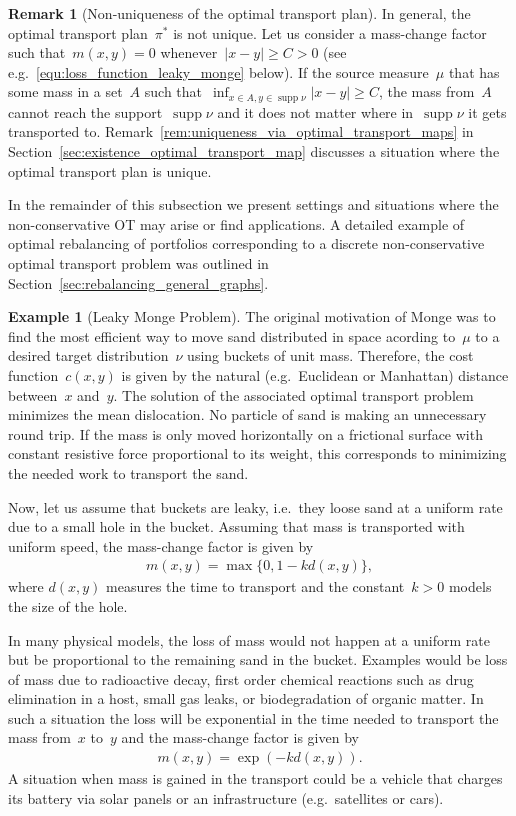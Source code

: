 \documentclass{article}
\theoremstyle{definition}
\newtheorem{example}[theorem]{Example}
\newtheorem{remark}[theorem]{Remark}
\DeclareMathOperator{\supp}{supp}
\begin{document}
\begin{remark}[Non-uniqueness of the optimal transport plan]
    In general, the optimal transport plan~$\pi^*$ is not unique. Let us consider a mass-change factor such that~$m(x,y)=0$ whenever~$|x-y| \geq C >0$ (see e.g.~\eqref{equ:loss_function_leaky_monge} below).  If the source measure~$\mu$ that has some mass in a set~$A$ such that~$\inf_{x \in A, y \in \supp \nu} |x-y| \geq C$, the mass from~$A$ cannot reach the support~$\supp \nu$ and it does not matter where in~$\supp \nu$ it gets transported to. Remark~\ref{rem:uniqueness_via_optimal_transport_maps} in Section~\ref{sec:existence_optimal_transport_map} discusses a situation where the optimal transport plan is unique. 
\end{remark}

In the remainder of this subsection we present settings and situations where the non-conservative OT may arise or find applications. A detailed example of optimal rebalancing of portfolios corresponding to a discrete non-conservative optimal transport problem was outlined in Section~\ref{sec:rebalancing_general_graphs}.
\begin{example}[Leaky Monge Problem]
    The original motivation of Monge was to find the most efficient way to move sand distributed in space acording to~$\mu$ to a desired target distribution~$\nu$ using buckets of unit mass. Therefore, the cost function~$c(x,y)$ is given by the natural (e.g.~Euclidean or Manhattan) distance between~$x$ and~$y$. 
    The solution of the associated optimal transport problem minimizes the mean dislocation. No particle of sand is making an unnecessary round trip. If the mass is only moved horizontally on a frictional surface with constant resistive force proportional to its weight, this corresponds to minimizing the needed work to transport the sand. 
    
    Now, let us assume that buckets are leaky, i.e.~they loose sand at a uniform rate due to a small hole in the bucket. Assuming that mass is transported with uniform speed, the mass-change factor is given by
    \begin{align}\label{equ:loss_function_leaky_monge}
        m(x,y) = \max\{0, 1- k d(x,y)\},
    \end{align}
    where $d(x,y)$ measures the time to transport and the constant~$k>0$ models the size of the hole.
    
    In many physical models, the loss of mass would not happen at a uniform rate but be proportional to the remaining sand in the bucket. Examples would be loss of mass due to radioactive decay, first order chemical reactions such as drug elimination in a host, small gas leaks, or biodegradation of organic matter. In such a situation the loss will be exponential in the time needed to transport the mass from~$x$ to~$y$ and the mass-change factor is given by
    \begin{align}\label{equ:loss_function_proportional_leaky_monge}
        m(x,y) = \exp(- k   d(x,y)).
    \end{align}
    A situation when mass is gained in the transport could be a vehicle that charges its battery via solar panels or an infrastructure (e.g.~satellites or cars). 
\end{example}
\end{document}
